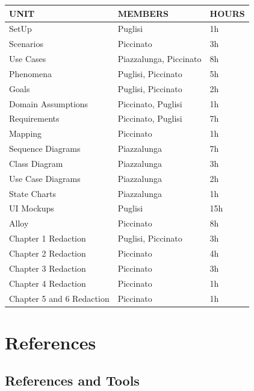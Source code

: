 \documentclass{Configuration_Files/Template}
\begin{document}
\begin{table}[h]
\centering
\begin{tabularx}{\textwidth}{| X | X | X |}
\hline
\textbf{UNIT} & \textbf{MEMBERS} & \textbf{HOURS} \\ [1ex]
\hline
SetUp & Puglisi & 1h \\ [1ex]
\hline
Scenarios & Piccinato & 3h \\ [1ex]
\hline
Use Cases & Piazzalunga, Piccinato & 8h \\ [1ex]
\hline
Phenomena & Puglisi, Piccinato & 5h \\ [1ex]
\hline
Goals & Puglisi, Piccinato & 2h \\ [1ex]
\hline
Domain Assumptions & Piccinato, Puglisi & 1h \\ [1ex]
\hline
Requirements & Piccinato, Puglisi & 7h \\ [1ex]
\hline
Mapping & Piccinato & 1h \\ [1ex]
\hline
Sequence Diagrams & Piazzalunga & 7h \\ [1ex]
\hline
Class Diagram & Piazzalunga & 3h \\ [1ex]
\hline
Use Case Diagrams & Piazzalunga & 2h \\ [1ex]
\hline
State Charts & Piazzalunga & 1h \\ [1ex]
\hline
UI Mockups & Puglisi & 15h \\ [1ex]
\hline
Alloy & Piccinato & 8h \\ [1ex]
\hline
Chapter 1 Redaction & Puglisi, Piccinato & 3h \\ [1ex]
\hline
Chapter 2 Redaction & Piccinato & 4h \\ [1ex]
\hline
Chapter 3 Redaction & Piccinato & 3h \\ [1ex]
\hline
Chapter 4 Redaction & Piccinato & 1h \\ [1ex]
\hline
Chapter 5 and 6 Redaction & Piccinato & 1h \\ [1ex]
\hline
\end{tabularx}
\end{table}

\chapter{References}

\section{References and Tools}
\end{document}
